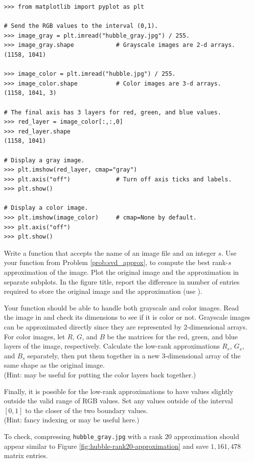 \begin{lstlisting}
>>> from matplotlib import pyplot as plt

# Send the RGB values to the interval (0,1).
>>> image_gray = plt.imread("hubble_gray.jpg") / 255.
>>> image_gray.shape            # Grayscale images are 2-d arrays.
(1158, 1041)

>>> image_color = plt.imread("hubble.jpg") / 255.
>>> image_color.shape           # Color images are 3-d arrays.
(1158, 1041, 3)

# The final axis has 3 layers for red, green, and blue values.
>>> red_layer = image_color[:,:,0]
>>> red_layer.shape
(1158, 1041)

# Display a gray image.
>>> plt.imshow(red_layer, cmap="gray")
>>> plt.axis("off")             # Turn off axis ticks and labels.
>>> plt.show()

# Display a color image.
>>> plt.imshow(image_color)     # cmap=None by default.
>>> plt.axis("off")
>>> plt.show()
\end{lstlisting}

\begin{problem} %
Write a function that accepts the name of an image file and an integer $s$.
Use your function from Problem \ref{prob:svd_approx}, to compute the best rank-$s$ approximation of the image.
Plot the original image and the approximation in separate subplots.
In the figure title, report the difference in number of entries required to store the original image and the approximation (use ).

Your function should be able to handle both grayscale and color images.
Read the image in and check its dimensions to see if it is color or not.
Grayscale images can be approximated directly since they are represented by 2-dimensional arrays.
For color images, let $R$, $G$, and $B$ be the matrices for the red, green, and blue layers of the image, respectively.
Calculate the low-rank approximations $R_s$, $G_s$, and $B_s$ separately, then put them together in a new 3-dimensional array of the same shape as the original image.
\\ (Hint:  may be useful for putting the color layers back together.)

Finally, it is possible for the low-rank approximations to have values slightly outside the valid range of RGB values.
Set any values outside of the interval $[0,1]$ to the closer of the two boundary values.
\\ (Hint: fancy indexing or  may be useful here.)

To check, compressing \texttt{hubble\_gray.jpg} with a rank $20$ approximation should appear similar to Figure \ref{fig:hubble-rank20-approximation} and save $1,161,478$ matrix entries.
\end{problem}

